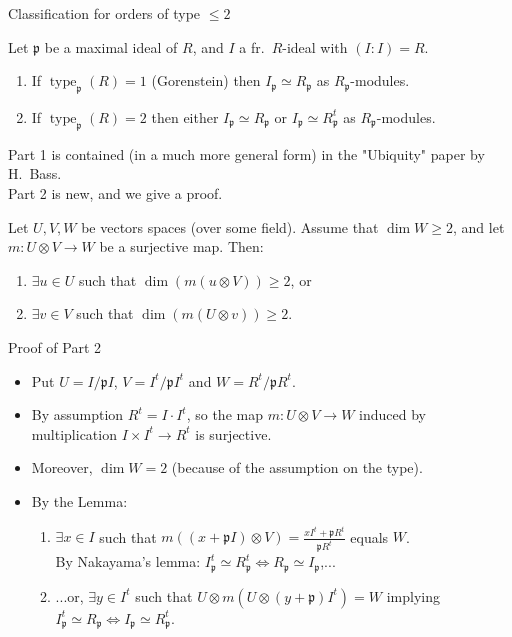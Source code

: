 \documentclass[usenames,dvipsnames,handout]{beamer}
\DeclareMathOperator{\type}{type}
\newcommand{\p}{{\mathfrak p}}
\begin{document}
\begin{frame}{ Classification for orders of type $\leq 2$ } 
    \begin{theorem}
        Let $\p$ be a maximal ideal of $R$, and $I$ a fr.~$R$-ideal with $(I:I)=R$.
        \begin{enumerate}
            \item \pause If $\type_\p(R)=1$ (Gorenstein) then $I_\p\simeq R_\p$ as $R_\p$-modules.
            \item \pause If $\type_\p(R)=2$ then either $I_\p\simeq R_\p$ or $I_\p\simeq R^t_\p$  as $R_\p$-modules.
        \end{enumerate}
    \end{theorem}

    \pause Part 1 is contained (in a much more general form) in the "Ubiquity" paper by H.~Bass.\\
    Part 2 is new, and we give a proof.
    \pause 
\begin{lemma}
    Let $U,V,W$ be vectors spaces (over some field). Assume that $\dim W \ge 2$, and let $m: U\otimes V\to W$ be a surjective map. Then:
    \begin{enumerate}
        \item \pause $\exists u\in U$ such that $\dim(m(u\otimes V)) \ge 2$, or
        \item \pause $\exists v\in V$ such that $\dim(m(U\otimes v)) \ge 2$.
    \end{enumerate}
\end{lemma}

\end{frame}


\begin{frame}{ Proof of Part 2 } 
    \begin{itemize}
    \item \pause Put $U = I/\p I$, $V = I^t/\p I^t$ and $W = R^t/\p R^t$.
    \item \pause By assumption $R^t = I \cdot I^t$, so the map $ m: U \otimes V \to W $ induced by multiplication $I \times I^t \to R^t$
    is surjective.
    \item \pause Moreover, $\dim W = 2$ (because of the assumption on the type).
    \item \pause By the Lemma:
    \begin{enumerate}
        \item $\exists x \in I$ such that $m( (x+\p I) \otimes V  ) = \frac{x I^t + \p R^t }{ \p R^t }$ equals $W$.\\
            By Nakayama's lemma: $I_\p^t\simeq R_\p^t \iff R_\p\simeq I_\p $,...
        \item \pause ...or, $\exists y \in I^t$ such that $U \otimes m( U \otimes (y+\p) I^t ) = W $ implying $I^t_\p \simeq R_\p \iff I_\p \simeq R^t_\p$.
    \end{enumerate}
	\end{itemize}
\end{frame}
\end{document}
